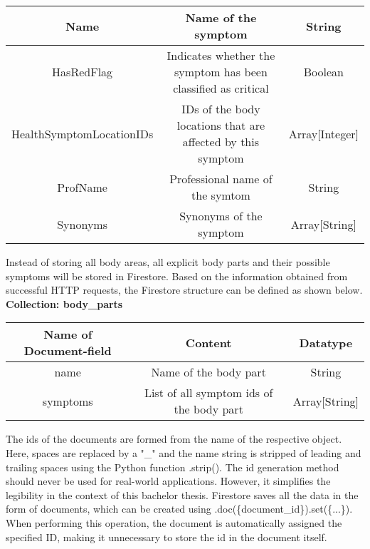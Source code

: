 \begin{itemize}
\begin{center}
\begin{tabular}{ | c| c| c | }
			\hline
			Name & Name of the symptom & String \\ 
			\hline
			HasRedFlag & Indicates whether the symptom has been classified as critical & Boolean \\ 
			\hline
			HealthSymptomLocationIDs & IDs of the body locations that are affected by this symptom & Array[Integer] \\ 
			\hline
			ProfName & Professional name of the symtom & String \\
			\hline 			
			Synonyms & Synonyms of the symptom & Array[String] \\
			\hline
		\end{tabular}
		\normalsize
	\end{center}
	
\end{itemize}
Instead of storing all body areas, all explicit body parts and their possible symptoms will be stored in Firestore. Based on the information obtained from successful HTTP requests, the Firestore structure can be defined as shown below.
\newline
\textbf{Collection: body\_parts}
\begin{center}
	\begin{tabular}{ | c| c| c | } 
		\hline
		Name of Document-field& Content & Datatype \\ 
		\hline
		name & Name of the body part & String \\ 
		\hline
		symptoms & List of all symptom ids of the body part  & Array[String] \\ 
		\hline
	\end{tabular}
\end{center}
The ids of the documents are formed from the name of the respective object. Here, spaces are replaced by a "\_" and the name string is stripped of leading and trailing spaces using the Python function .strip(). The id generation method should never be used for real-world applications. However, it simplifies the legibility in the context of this bachelor thesis. Firestore saves all the data in the form of documents, which can be created using .doc(\{document\_id\}).set(\{...\}). When performing this operation, the document is automatically assigned the specified ID, making it unnecessary to store the id in the document itself.

